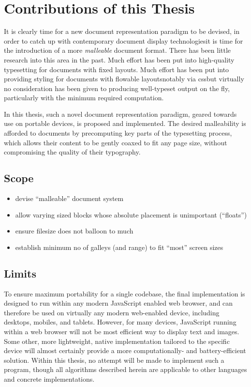 \section{Contributions of this Thesis}

It is clearly time for a new document representation paradigm to be devised, in order to catch up with contemporary document display technologies\ed it is time for the introduction of a more \emph{malleable} document format. There has been little research into this area in the past. Much effort has been put into high-quality typesetting for documents with fixed layouts. Much effort has been put into providing styling for documents with flowable layouts\ed notably via css\ed but virtually no consideration has been given to producing well-typeset output on the fly, particularly with the minimum required computation.

In this thesis, such a novel document representation paradigm, geared towards use on portable devices, is proposed and implemented. The desired malleability is afforded to documents by precomputing key parts of the typesetting process, which allows their content to be gently coaxed to fit any page size, without compromising the quality of their typography.


\subsection{Scope}
\begin{itemize}
 \item devise ``malleable'' document system
 \item allow varying sized blocks whose absolute placement is unimportant (``floats'')
 \item ensure filesize does not balloon to much
 \item establish minimum no of galleys (and range) to fit ``most'' screen sizes
\end{itemize}



\subsection{Limits}

To ensure maximum portability for a single codebase, the final implementation is designed to run within any modern JavaScript enabled web browser, and can therefore be used on virtually any modern web-enabled device, including desktops, mobiles, and tablets. However, for many devices, JavaScript running within a web browser will not be most efficient way to display text and images. Some other, more lightweight, native implementation tailored to the specific device will almost certainly provide a more computationally- and battery-efficient solution. Within this thesis, no attempt will be made to implement such a program, though all algorithms described herein are applicable to other languages and concrete implementations.

